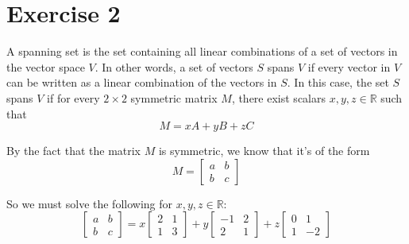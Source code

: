 \section{Exercise 2}

A spanning set is the set containing all linear combinations of a set of vectors in the vector space $V$. In other words, a set of vectors $S$ spans $V$ if every vector in $V$ can be written as a linear combination of the vectors in $S$. In this case, the set $S$ spans $V$ if for every $2\times 2$ symmetric matrix $M$, there exist scalars $x,y,z\in\mathbb{R}$ such that
$$
	M = xA + yB + zC
$$

By the fact that the matrix $M$ is symmetric, we know that it's of the form
$$
	M = \begin{bmatrix}a & b\\b & c\end{bmatrix}
$$

So we must solve the following for $x,y,z\in\mathbb{R}$:
$$
	\begin{bmatrix}a & b\\b & c\end{bmatrix} = x\begin{bmatrix}2 & 1\\1 & 3\end{bmatrix} + y\begin{bmatrix}-1 & 2\\2 & 1\end{bmatrix} + z\begin{bmatrix}0 & 1\\1 & -2\end{bmatrix}
$$

